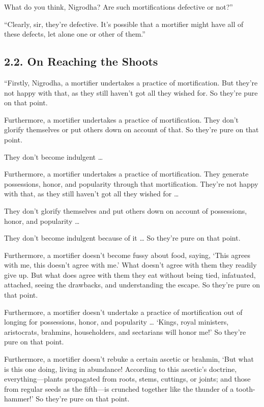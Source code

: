 \documentclass[12pt,openany]{book}%
\begin{document}
What do you think, Nigrodha? Are such mortifications defective or not?” 

“Clearly, sir, they’re defective. It’s possible that a mortifier might have all of these defects, let alone one or other of them.” 

\subsection*{2.2. On Reaching the Shoots }

“Firstly, Nigrodha, a mortifier undertakes a practice of mortification. But they’re not happy with that, as they still haven’t got all they wished for. So they’re pure on that point. 

Furthermore, a mortifier undertakes a practice of mortification. They don’t glorify themselves or put others down on account of that. So they’re pure on that point. 

They don’t become indulgent … 

Furthermore, a mortifier undertakes a practice of mortification. They generate possessions, honor, and popularity through that mortification. They’re not happy with that, as they still haven’t got all they wished for … 

They don’t glorify themselves and put others down on account of possessions, honor, and popularity … 

They don’t become indulgent because of it … So they’re pure on that point. 

Furthermore, a mortifier doesn’t become fussy about food, saying, ‘This agrees with me, this doesn’t agree with me.’ What doesn’t agree with them they readily give up. But what does agree with them they eat without being tied, infatuated, attached, seeing the drawbacks, and understanding the escape. So they’re pure on that point. 

Furthermore, a mortifier doesn’t undertake a practice of mortification out of longing for possessions, honor, and popularity … ‘Kings, royal ministers, aristocrats, brahmins, householders, and sectarians will honor me!’ So they’re pure on that point. 

Furthermore, a mortifier doesn’t rebuke a certain ascetic or brahmin, ‘But what is this one doing, living in abundance! According to this ascetic’s doctrine, everything—plants propagated from roots, stems, cuttings, or joints; and those from regular seeds as the fifth—is crunched together like the thunder of a tooth-hammer!’ So they’re pure on that point. 
\end{document}
